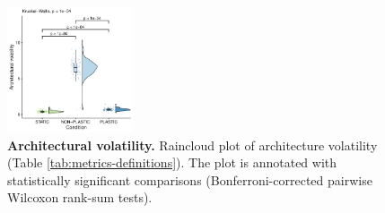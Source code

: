 \begin{figure}[ht!]
    \centering
    \includegraphics[width=0.33\textwidth]{media/architecture/architectural_volatility.pdf}
    \caption{\small
        \textbf{Architectural volatility.}
        Raincloud plot of architecture volatility (Table \ref{tab:metrics-definitions}).
        The plot is annotated with statistically significant comparisons (Bonferroni-corrected pairwise Wilcoxon rank-sum tests). 
    }
    \label{fig:architecture_volatility}
\end{figure}